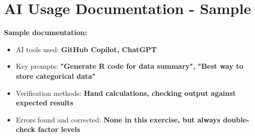 \documentclass[11pt]{article}
\begin{document}
\section{AI Usage Documentation - Sample}
\begin{tcolorbox}[colback=gray!10,colframe=gray,boxrule=1pt,arc=2pt,left=6pt,right=6pt,top=6pt,bottom=6pt]
\textbf{Sample documentation:}
\begin{itemize}
\item AI tools used: \textcolor{answergreen}{\textbf{GitHub Copilot, ChatGPT}}
\item Key prompts: \textcolor{answergreen}{\textbf{"Generate R code for data summary", "Best way to store categorical data"}}
\item Verification methods: \textcolor{answergreen}{\textbf{Hand calculations, checking output against expected results}}
\item Errors found and corrected: \textcolor{answergreen}{\textbf{None in this exercise, but always double-check factor levels}}
\end{itemize}
\end{tcolorbox}
\end{document}
